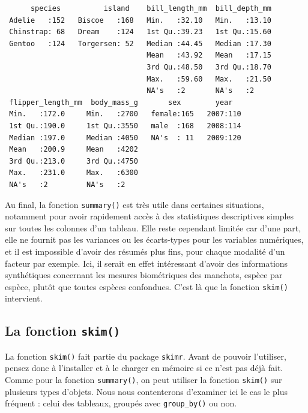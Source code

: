 \documentclass[
  a4paper,
  DIV=11,
  numbers=noendperiod,
  oneside]{scrreprt}
\begin{document}
\begin{verbatim}
      species          island    bill_length_mm  bill_depth_mm  
 Adelie   :152   Biscoe   :168   Min.   :32.10   Min.   :13.10  
 Chinstrap: 68   Dream    :124   1st Qu.:39.23   1st Qu.:15.60  
 Gentoo   :124   Torgersen: 52   Median :44.45   Median :17.30  
                                 Mean   :43.92   Mean   :17.15  
                                 3rd Qu.:48.50   3rd Qu.:18.70  
                                 Max.   :59.60   Max.   :21.50  
                                 NA's   :2       NA's   :2      
 flipper_length_mm  body_mass_g       sex        year    
 Min.   :172.0     Min.   :2700   female:165   2007:110  
 1st Qu.:190.0     1st Qu.:3550   male  :168   2008:114  
 Median :197.0     Median :4050   NA's  : 11   2009:120  
 Mean   :200.9     Mean   :4202                          
 3rd Qu.:213.0     3rd Qu.:4750                          
 Max.   :231.0     Max.   :6300                          
 NA's   :2         NA's   :2                             
\end{verbatim}

Au final, la fonction \texttt{summary()} est très utile dans certaines
situations, notamment pour avoir rapidement accès à des statistiques
descriptives simples sur toutes les colonnes d'un tableau. Elle reste
cependant limitée car d'une part, elle ne fournit pas les variances ou
les écarts-types pour les variables numériques, et il est impossible
d'avoir des résumés plus fins, pour chaque modalité d'un facteur par
exemple. Ici, il serait en effet intéressant d'avoir des informations
synthétiques concernant les mesures biométriques des manchots, espèce
par espèce, plutôt que toutes espèces confondues. C'est là que la
fonction \texttt{skim()} intervient.

\hypertarget{sec-skim}{%
\subsection{\texorpdfstring{La fonction
\texttt{skim()}}{La fonction skim()}}\label{sec-skim}}

La fonction \texttt{skim()} fait partie du package \texttt{skimr}. Avant
de pouvoir l'utiliser, pensez donc à l'installer et à le charger en
mémoire si ce n'est pas déjà fait. Comme pour la fonction
\texttt{summary()}, on peut utiliser la fonction \texttt{skim()} sur
plusieurs types d'objets. Nous nous contenterons d'examiner ici le cas
le plus fréquent : celui des tableaux, groupés avec \texttt{group\_by()}
ou non.
\end{document}
